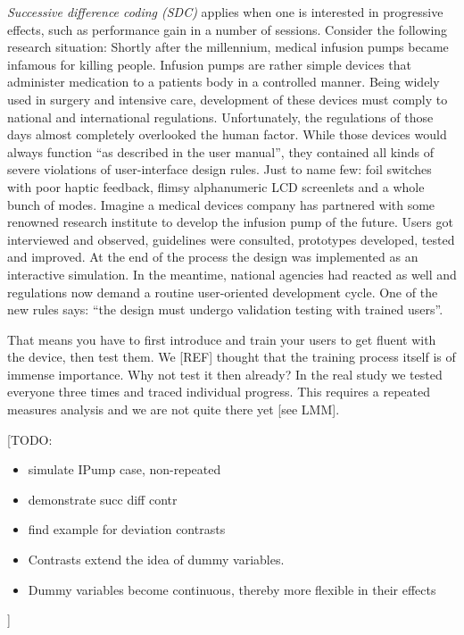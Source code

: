 \documentclass[]{svmono}
\begin{document}
\emph{Successive difference coding (SDC)} applies when one is interested
in progressive effects, such as performance gain in a number of
sessions. Consider the following research situation: Shortly after the
millennium, medical infusion pumps became infamous for killing people.
Infusion pumps are rather simple devices that administer medication to a
patients body in a controlled manner. Being widely used in surgery and
intensive care, development of these devices must comply to national and
international regulations. Unfortunately, the regulations of those days
almost completely overlooked the human factor. While those devices would
always function ``as described in the user manual'', they contained all
kinds of severe violations of user-interface design rules. Just to name
few: foil switches with poor haptic feedback, flimsy alphanumeric LCD
screenlets and a whole bunch of modes. Imagine a medical devices company
has partnered with some renowned research institute to develop the
infusion pump of the future. Users got interviewed and observed,
guidelines were consulted, prototypes developed, tested and improved. At
the end of the process the design was implemented as an interactive
simulation. In the meantime, national agencies had reacted as well and
regulations now demand a routine user-oriented development cycle. One of
the new rules says: ``the design must undergo validation testing with
trained users''.

That means you have to first introduce and train your users to get
fluent with the device, then test them. We {[}REF{]} thought that the
training process itself is of immense importance. Why not test it then
already? In the real study we tested everyone three times and traced
individual progress. This requires a repeated measures analysis and we
are not quite there yet {[}see LMM{]}.

{[}TODO:

\begin{itemize}
\item
  simulate IPump case, non-repeated
\item
  demonstrate succ diff contr
\item
  find example for deviation contrasts
\item
  Contrasts extend the idea of dummy variables.
\item
  Dummy variables become continuous, thereby more flexible in their
  effects
\end{itemize}

{]}
\end{document}
